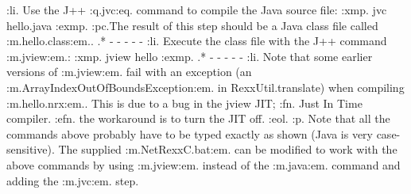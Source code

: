 :li.
Use the J++ :q.jvc:eq. command to compile the Java source file:
:xmp.
jvc hello.java
:exmp.
:pc.The result of this step should be a Java class file
called :m.hello.class:em..
.* - - - - -
:li.
Execute the class file with the J++ command :m.jview:em.:
:xmp.
jview hello
:exmp.
.* - - - - -
:li.
Note that some earlier versions of :m.jview:em. fail with an exception
(an :m.ArrayIndexOutOfBoundsException:em. in RexxUtil.translate) when
compiling :m.hello.nrx:em..  This is due to a bug in the jview JIT;
:fn.
Just In Time compiler.
:efn.
the workaround is to turn the JIT off.
:eol.
:p.
Note that all the commands above probably have to be typed exactly as
shown (Java is very case-sensitive).  The supplied :m.NetRexxC.bat:em.
can be modified to work with the above commands by using :m.jview:em.
instead of the :m.java:em. command and adding the :m.jvc:em. step.

